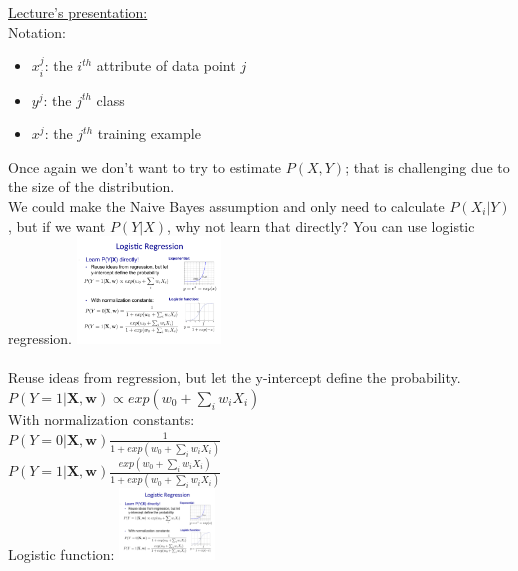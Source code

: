 \underline{Lecture's presentation:} \hfill \\

Notation:  \hfill \\
\begin{itemize}
	\item $x_i^j$: the $i^{th}$ attribute of data point $j$
	\item $y^j$: the $j^{th}$ class  %
	\item $x^j$: the $j^{th}$ training example
\end{itemize}

Once again we don't want to try to estimate $P(X,Y)$; that is challenging due to the size of the distribution. \hfill \\
We could make the Naive Bayes assumption and only need to calculate $P(X_i | Y)$, 
but if we want $P(Y|X)$, why not learn that directly?  You can use logistic regression. 
\includegraphics[width=1.5in]{figures/expo.pdf}     \hfill \\
\hfill \\

Reuse ideas from regression, but let the y-intercept define the probability.  \hfill \\
$P(Y=1|\bm{X, w}) \propto exp(w_0 + \sum_i w_i X_i)$  \hfill \\
With normalization constants:  \hfill \\
$\displaystyle  P(Y=0|\bm{X, w}) \frac{1}{1+ exp(w_0 + \sum_i w_i X_i)} $ \hfill \\
$\displaystyle  P(Y=1|\bm{X, w}) \frac{exp(w_0 + \sum_i w_i X_i)}{1+ exp(w_0 + \sum_i w_i X_i)} $ \hfill \\
Logistic function: \includegraphics[width=1in]{figures/logistic.pdf}     \hfill \\
 \hfill \\
 
